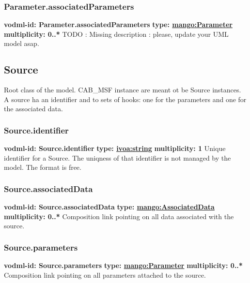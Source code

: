     \subsubsection{Parameter.associatedParameters}
      \textbf{vodml-id: Parameter.associatedParameters} \newline
      \textbf{type: \hyperref[sect:Parameter]{mango:Parameter}} \newline
      \textbf{multiplicity: 0..*} \newline 
      TODO : Missing description : please, update your UML model asap.

  \subsection{Source}
  \label{sect:Source}
    Root class of the model. CAB\_MSF instance are meant ot be Source instances. A source ha an identifier and to sets of hooks: one for the parameters and one for the associated data.

    \subsubsection{Source.identifier}
      \textbf{vodml-id: Source.identifier} \newline
      \textbf{type: \hyperref[sect:ivoa]{ivoa:string}} \newline
      \textbf{multiplicity: 1} \newline 
      Unique identifier for a Source. The uniqness of that identifier is not managed by the model. The format is free.

    \subsubsection{Source.associatedData}
      \textbf{vodml-id: Source.associatedData} \newline
      \textbf{type: \hyperref[sect:AssociatedData]{mango:AssociatedData}} \newline
      \textbf{multiplicity: 0..*} \newline 
      Composition link pointing on all data associated with the source.

    \subsubsection{Source.parameters}
      \textbf{vodml-id: Source.parameters} \newline
      \textbf{type: \hyperref[sect:Parameter]{mango:Parameter}} \newline
      \textbf{multiplicity: 0..*} \newline 
      Composition link pointing on all parameters attached to the source.

